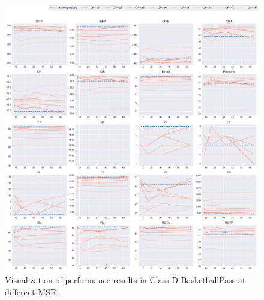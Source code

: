 \begin{figure}[!htbp]
\centering
\includegraphics[width=1.0\linewidth]{img/appendix/BasketballPass_all_multiplots_msr.pdf}
\caption[Visualization of performance results in Class D BasketballPass at different MSR]
{Visualization of performance results in Class D BasketballPass at different MSR.}
\label{fig:BasketballPass_all_msr}
\end{figure}



